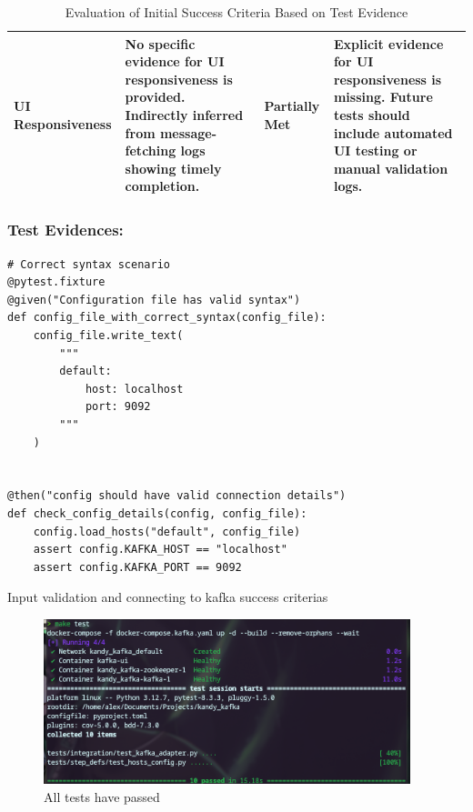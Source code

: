 \documentclass[10pt , a4paper]{report}
\newenvironment{code}{\captionsetup{type=listing}}{}
\begin{document}
\begin{table}[h!tbp]
\begin{adjustbox}{max width=\textwidth}
\begin{tabular}{|p{3.5cm}|p{5.5cm}|p{3.5cm}|p{3.5cm}|}
\textbf{UI Responsiveness} & 
No specific evidence for UI responsiveness is provided. Indirectly inferred from message-fetching logs showing timely completion. & 
Partially Met & 
Explicit evidence for UI responsiveness is missing. Future tests should include automated UI testing or manual validation logs. \\ \hline

\end{tabular}
\end{adjustbox}
\caption{Evaluation of Initial Success Criteria Based on Test Evidence}
\label{tab:success-evaluation}
\end{table}

\newpage
\subsubsection{Test Evidences:}

\begin{code}
  \begin{verbatim}
# Correct syntax scenario
@pytest.fixture
@given("Configuration file has valid syntax")
def config_file_with_correct_syntax(config_file):
    config_file.write_text(
        """
        default:
            host: localhost
            port: 9092
        """
    )


@then("config should have valid connection details")
def check_config_details(config, config_file):
    config.load_hosts("default", config_file)
    assert config.KAFKA_HOST == "localhost"
    assert config.KAFKA_PORT == 9092
\end{verbatim}
\caption{Input validation and connecting to kafka success criterias}
\end{code}

\begin{figure}[htbp]
  \begin{center}
    \includegraphics[width=0.95\textwidth]{imgs/FinalTestData.png}
  \end{center}
  \caption{All tests have passed}\label{fig:}
\end{figure}
\end{document}
